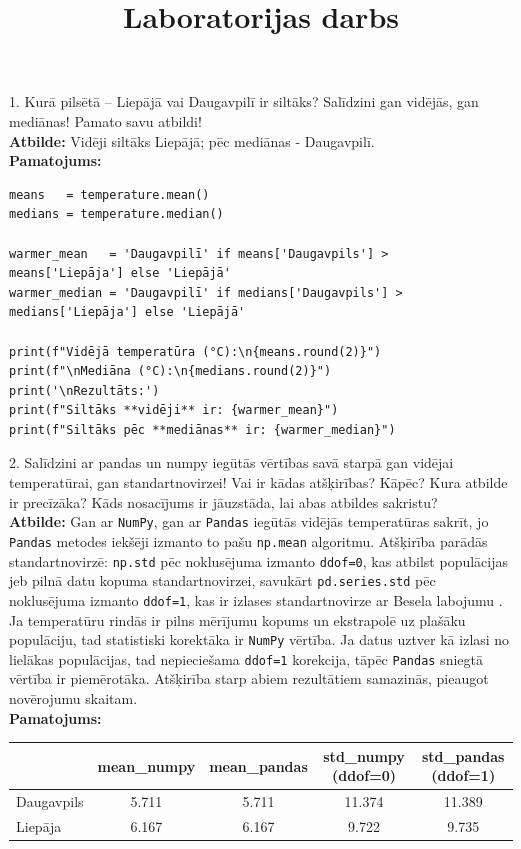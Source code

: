 \documentclass[12pt]{article}
\title{\vspace{-1cm}\centering Laboratorijas darbs \\[1ex] \large \say{Statistika} \vspace{-6em}}
\author{}
\date{}
\begin{document}
\maketitle

1. Kurā pilsētā – Liepājā vai Daugavpilī ir siltāks? Salīdzini gan vidējās, gan mediānas! Pamato savu atbildi!\\

\textbf{Atbilde:} Vidēji siltāks Liepājā; pēc mediānas - Daugavpilī. \\

\textbf{Pamatojums:}

\begin{verbatim}
means   = temperature.mean() 
medians = temperature.median()

warmer_mean   = 'Daugavpilī' if means['Daugavpils'] > 
means['Liepāja'] else 'Liepājā'
warmer_median = 'Daugavpilī' if medians['Daugavpils'] > 
medians['Liepāja'] else 'Liepājā'

print(f"Vidējā temperatūra (°C):\n{means.round(2)}")
print(f"\nMediāna (°C):\n{medians.round(2)}")
print('\nRezultāts:')
print(f"Siltāks **vidēji** ir: {warmer_mean}")
print(f"Siltāks pēc **mediānas** ir: {warmer_median}")
\end{verbatim}

2. Salīdzini ar pandas un numpy iegūtās vērtības savā starpā gan vidējai temperatūrai, gan standartnovirzei! Vai ir kādas atšķirības? Kāpēc? Kura atbilde ir precīzāka? Kāds nosacījums ir jāuzstāda, lai abas atbildes sakristu?\\

\textbf{Atbilde:} Gan ar \texttt{NumPy}, gan ar \texttt{Pandas} iegūtās vidējās temperatūras sakrīt, jo \texttt{Pandas} metodes iekšēji izmanto to pašu \texttt{np.mean} algoritmu. Atšķirība parādās standartnovirzē: \texttt{np.std} pēc noklusējuma izmanto \texttt{ddof=0}, kas atbilst populācijas jeb pilnā datu kopuma standartnovirzei, savukārt \texttt{pd.series.std} pēc noklusējuma izmanto \texttt{ddof=1}, kas ir izlases standartnovirze ar Besela labojumu \cite{Reichmann1961}. Ja temperatūru rindās ir pilns mērījumu kopums un ekstrapolē uz plašāku populāciju, tad statistiski korektāka ir \texttt{NumPy} vērtība. Ja datus uztver kā izlasi no lielākas populācijas, tad nepieciešama \texttt{ddof=1} korekcija, tāpēc \texttt{Pandas} sniegtā vērtība ir piemērotāka. Atšķirība starp abiem rezultātiem samazinās, pieaugot novērojumu skaitam.\\

\textbf{Pamatojums:}
\begin{table}[h]
\centering
\begin{tabular}{lcccc}
\hline
            & mean\_numpy & mean\_pandas & std\_numpy (ddof=0) & std\_pandas (ddof=1) \\
\hline
Daugavpils  & 5.711 & 5.711 & 11.374 & 11.389 \\
Liepāja     & 6.167 & 6.167 &  9.722 &  9.735 \\
\hline
\end{tabular}
\end{table}
\end{document}
